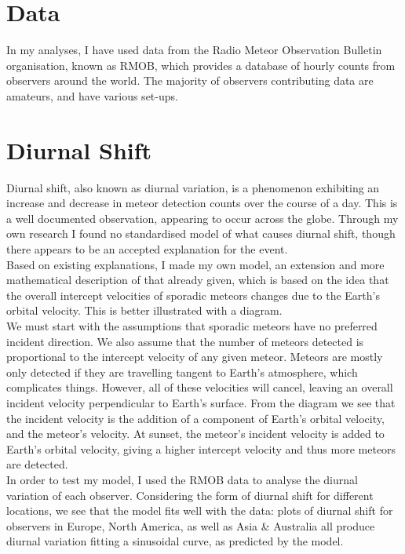 \documentclass[12pt]{article}
\begin{document}
\section{Data}
\large{
In my analyses, I have used data from the Radio Meteor Observation Bulletin
organisation, known as RMOB, which provides a database of hourly counts from
observers around the world. The majority of observers contributing data are 
amateurs, and have various set-ups.

\section{Diurnal Shift}

\large{
Diurnal shift, also known as diurnal variation, is a phenomenon exhibiting an
increase and decrease in meteor detection counts over the course of a day. This
is a well documented observation, appearing to occur across the globe. Through
my own research I found no standardised model of what causes diurnal shift,
though there appears to be an accepted explanation for the event.\\

Based on existing explanations, I made my own model, an extension and more
mathematical description of that already given, which is based on the idea that
the overall intercept velocities of sporadic meteors changes due to the Earth's
orbital velocity. This is better illustrated with a diagram. \\

We must start with the assumptions that sporadic meteors have no preferred
incident direction. We also assume that the number of meteors detected is
proportional to the intercept velocity of any given meteor. Meteors are mostly
only detected if they are travelling tangent to Earth's atmosphere, which
complicates things. However, all of these velocities will cancel, leaving an
overall incident velocity perpendicular to Earth's surface. From the diagram we
see that the incident velocity is the addition of a component of Earth's orbital
velocity, and the meteor's velocity. At sunset, the meteor's incident velocity
is added to Earth's orbital velocity, giving a higher intercept velocity and
thus more meteors are detected.\\ 

In order to test my model, I used the RMOB data to analyse the diurnal variation
of each observer. Considering the form of diurnal shift for different locations,
we see that the model fits well with the data: plots of diurnal shift for
observers in Europe, North America, as well as Asia \& Australia all produce
diurnal variation fitting a sinusoidal curve, as predicted by the model.\\

}}
\end{document}
